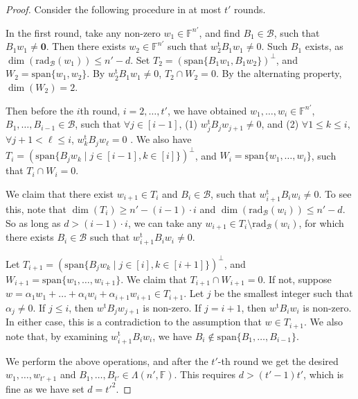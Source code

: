 \documentclass[10pt]{article}
\newcommand{\tuple}[1]{\mathbf{#1}}
\newcommand{\spa}[1]{\mathcal{#1}}
\newcommand{\F}{\mathbb{F}}
\newcommand{\rad}{\mathrm{rad}}
\renewcommand{\span}{\mathrm{span}}
\newcommand{\cB}{\spa{B}}
\newcommand{\vzero}{\tuple{0}}
\newcommand{\tr}[1]{#1^{\mathrm{t}}}
\begin{document}
\begin{proof}
%
%
%
%
%
%
%
%
%
%
%
%
%

%
%
%
%
%

%
Consider the following procedure in at most $t'$ 
rounds. 

In the first round, take any non-zero $w_1\in \F^{n'}$, and find $B_1\in \cB$, 
such that $B_1w_1\neq\vzero$. Then there exists $w_2\in\F^{n'}$
such that $\tr{w_2}B_1w_1\neq 0$. Such $B_1$ exists, as $\dim(\rad_{\cB}(w_1))\leq 
n'-d$. Set $T_2=(\span\{ B_1w_1, B_1w_2\})^\perp$, and 
$W_2=\span\{ w_1, w_2\}$. By $\tr{w_2}B_1w_1\neq 0$, $T_2\cap W_2=0$. By the 
alternating property, $\dim(W_2)=2$. 

%
%
%
%
%
%
%
%
%
%
%
%
%
%
%
%
%
%
%
%
%
%
%

Then before the $i$th round, $i=2, \dots, t'$, we have obtained $w_1, 
\dots, 
w_i\in \F^{n'}$, $B_1, 
\dots, B_{i-1}\in \cB$, 
such that $\forall j\in[i-1]$, (1) $\tr{w_j}B_jw_{j+1}\neq 0$, and (2) $\forall 
1\leq 
k\leq i$, $\forall j+1<\ell\leq i$, $\tr{w_k}B_jw_\ell=0$ . We 
also have $T_i=(\span\{ B_jw_k \mid j\in[i-1], k\in[i]\})^\perp$, and $W_i=\span\{ 
w_1, \dots, w_i\}$, such that $T_i\cap W_i=0$. 

We claim that there exist 
$w_{i+1}\in T_i$ and $B_i\in \cB$, such that $\tr{w_{i+1}}B_iw_i\neq 0$. To see 
this, note that $\dim(T_i)\geq n'-(i-1)\cdot i$ and $\dim(\rad_\cB(w_i))\leq 
n'-d$. So as long as $d>(i-1)\cdot i$, we can take any $w_{i+1}\in T_i\setminus 
\rad_{\cB}(w_i)$, for which there exists $B_i\in \cB$ such that 
$\tr{w_{i+1}}B_iw_i\neq 0$. 

Let $T_{i+1}=(\span\{ B_jw_k \mid j\in[i], k\in[i+1]\})^\perp$, and 
$W_{i+1}=\span\{ w_1, \dots, w_{i+1}\}$. We claim that $T_{i+1}\cap 
W_{i+1}=0$. If not, suppose 
$w=\alpha_1w_1+\dots+\alpha_iw_i+\alpha_{i+1}w_{i+1}\in 
T_{i+1}$. Let $j$ be the smallest integer such that $\alpha_j\neq 0$. If $j\leq 
i$, then $\tr{w}B_jw_{j+1}$ is non-zero. If $j=i+1$, then $\tr{w}B_iw_i$ is 
non-zero. In 
either case, this is a contradiction to the assumption that $w\in T_{i+1}$. We 
also note that, by examining $\tr{w_{i+1}}B_iw_i$, we have $B_i\not\in\span\{ B_1, 
\dots, B_{i-1}\}$. 

We perform the above operations, and after the $t'$-th round we get the desired 
$w_1, 
\dots, w_{t'+1}$ and $B_1, \dots, B_{t'}\in\Lambda(n', \F)$. This requires 
$d>(t'-1)t'$, which is 
fine as we have set $d=t'^2$. 


\end{proof}
\end{document}
